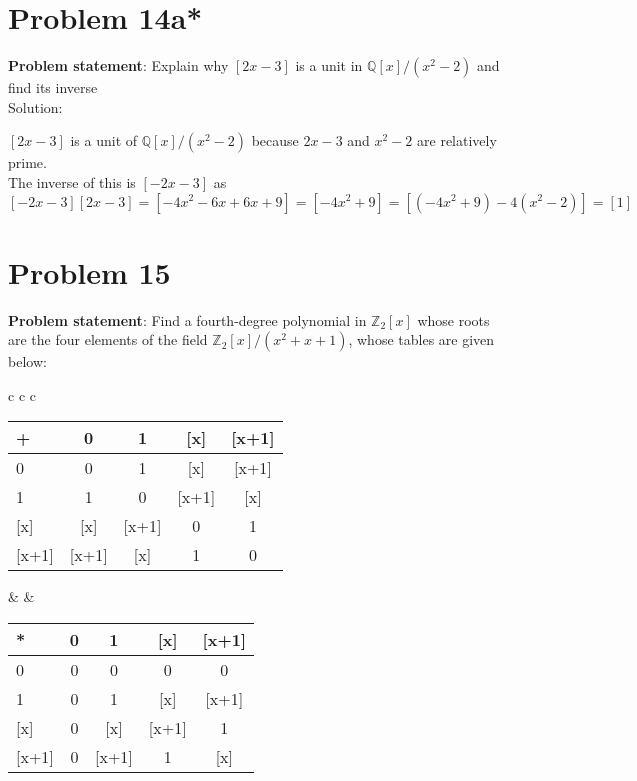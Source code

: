 \documentclass{article} %
\begin{document}
\newpage

\section*{Problem 14a*}


\textbf{Problem statement}: Explain why $[2x-3]$ is a unit in $\mathbb{Q}[x]/(x^2-2)$ and find its inverse
\\

Solution: 
\begin{addmargin}[1em]{0em}
$[2x-3]$ is a unit of $\mathbb{Q}[x]/(x^2 - 2)$ because $2x - 3$ and $x^2 - 2$ are relatively prime.
\\The inverse of this is $[-2x - 3]$ as $[-2x - 3][2x-3] = [-4x^2 -6x + 6x + 9] = [-4x^2 + 9] = [(-4x^2 + 9) - 4(x^2 - 2)] = [1]$
\end{addmargin}

\newpage

\section*{Problem 15}


\textbf{Problem statement}: Find a fourth-degree polynomial in $\mathbb{Z}_2[x]$ whose roots are the four elements of the field $\mathbb{Z}_2[x]/(x^2 + x + 1)$, whose tables are given below: \\
\begin{tabular}{c c c}
\begin{tabular}{l | c c c c }
+       & 0        & 1         & [x]      & [x+1] \\ \hline
0        & 0        & 1         & [x]      & [x+1] \\
1        & 1        & 0         & [x+1] & [x]      \\
{[}x]     & [x]      & [x+1] & 0         & 1         \\
{[}x+1] & [x+1] & [x]     & 1         & 0         \\
\end{tabular}
& \quad &
\begin{tabular}{l | c c c c }
*       & 0        & 1         & [x]      & [x+1] \\ \hline
0        & 0        &0        & 0      & 0 \\
1        & 0        & 1         & [x] & [x+1]      \\
{[}x]     & 0     & [x] & [x+1]         & 1         \\
{[}x+1] & 0& [x+1]     & 1         & [x]         \\
\end{tabular}
\end{tabular}
\\
\end{document}
